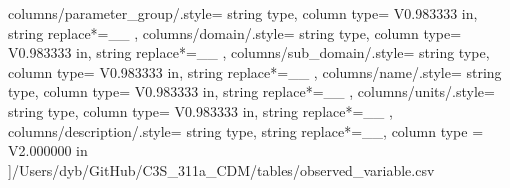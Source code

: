     columns/parameter_group/.style={
            string type, 
            column type= V{0.983333 in}, 
            string replace*={_}{\_}
        },
    columns/domain/.style={
            string type, 
            column type= V{0.983333 in}, 
            string replace*={_}{\_}
        },
    columns/sub_domain/.style={
            string type, 
            column type= V{0.983333 in}, 
            string replace*={_}{\_}
        },
    columns/name/.style={
            string type, 
            column type= V{0.983333 in}, 
            string replace*={_}{\_}
        },
    columns/units/.style={
            string type, 
            column type= V{0.983333 in}, 
            string replace*={_}{\_}
        },
    columns/description/.style={
            string type, 
            string replace*={_}{\_},
            column type = V{2.000000 in}
        }
    ]{/Users/dyb/GitHub/C3S_311a_CDM/tables/observed_variable.csv}
